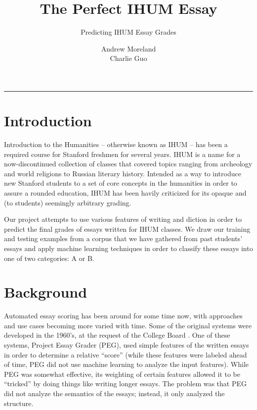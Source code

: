 \documentclass[11pt,acticle]{scrartcl}
\title{The Perfect IHUM Essay}
\subtitle{Predicting IHUM Essay Grades}
\author{Andrew Moreland \\ Charlie Guo}
\date{}
\begin{document}
\maketitle
\rule{\linewidth}{0.4pt}

\begin{multicols}{2}

\vspace{-0.3in}
\setlength{\parskip}{10pt plus 1pt minus 1pt}

\section{Introduction}
Introduction to the Humanities -- otherwise known as IHUM -- has been a required course for Stanford freshmen for several years. IHUM is a name for a now-discontinued collection of classes that covered topics ranging from archeology and world religions to Russian literary history. Intended as a way to introduce new Stanford students to a set of core concepts in the humanities in order to assure a rounded education, IHUM has been havily criticized for its opaque and (to students) seemingly arbitrary grading.

Our project attempts to use various features of writing and diction in order to predict the final grades of essays written for IHUM classes. We draw our training and testing examples from a corpus that we have gathered from past students' essays and apply machine learning techniques in order to classify these essays into one of two categories: A or B.

\section{Background}

Automated essay scoring has been around for some time now, with approaches and use cases becoming more varied with time. Some of the original systems were developed in the 1960's, at the request of the College Board . One of these systems, Project Essay Grader (PEG), used simple features of the written essays in order to determine a relative ``score'' (while these features were labeled ahead of time, PEG did not use machine learning to analyze the input features). While PEG was somewhat effective, its weighting of certain features allowed it to be ``tricked'' by doing things like writing longer essays. The problem was that PEG did not analyze the semantics of the essays; instead, it only analyzed the structure.


\end{multicols}
\end{document}
